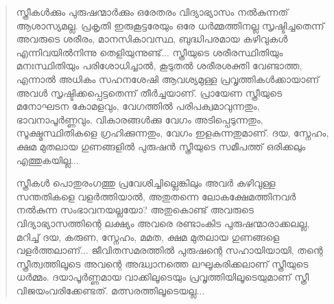 \begin{quotation}

\noindent
സ്ത്രീകൾക്കും പുരുഷന്മാർക്കും ഒരേതരം വിദ്യാഭ്യാസം നൽകുന്നത് ആശാസ്യമല്ല. പ്രകൃതി ഇരുകൂട്ടരേയും ഒരേ ധർമ്മത്തിനല്ല സൃഷ്ടിച്ചതെന്ന് അവരുടെ ശരീരം, മാനസികാവസ്ഥ, ബുദ്ധിപരമായ കഴിവുകൾ എന്നിവയിൽനിന്നു തെളിയുന്നുണ്ട്... സ്ത്രീയുടെ ശരീരസ്ഥിതിയും മനഃസ്ഥിതിയും പരിശോധിച്ചാൽ, കൂടുതൽ ശരീരശക്തി വേണ്ടാത്ത, എന്നാൽ അധികം സഹനശേഷി ആവശ്യമുള്ള പ്രവൃത്തികൾക്കായാണ് അവൾ സൃഷ്ടിക്കപ്പെട്ടതെന്ന് തീർച്ചയാണ്. പ്രായേണ സ്ത്രീയുടെ മനോഘടന കോമളവും, വേഗത്തിൽ പരിപക്വമാവുന്നതും, ഭാവനാപൂർണ്ണവും, വികാരങ്ങൾക്കു വേഗം അടിപ്പെടുന്നതും, സൂക്ഷ്മസ്ഥിതികളെ ഗ്രഹിക്കുന്നതും, വേഗം ഇളകുന്നതുമാണ്. ദയ, സ്നേഹം, ക്ഷമ മുതലായ ഗുണങ്ങളിൽ പുരുഷൻ സ്ത്രീയുടെ സമീപത്ത് ഒരിക്കലും എത്തുകയില്ല...

\noindent
സ്ത്രീകൾ പൊതുരംഗത്തു പ്രവേശിച്ചില്ലെങ്കിലും അവർ കഴിവുള്ള സന്തതികളെ വളർത്തിയാൽ, അതുതന്നെ ലോകക്ഷേമത്തിനവർ നൽകുന്ന സംഭാവനയല്ലയോ? അതുകൊണ്ട് അവരുടെ വിദ്യാഭ്യാസത്തിന്റെ ലക്ഷ്യം അവരെ രണ്ടാംകിട പുരുഷന്മാരാക്കലല്ല, മറിച്ച് ദയ, കരുണ, സ്നേഹം, മമത, ക്ഷമ മുതലായ ഗുണങ്ങളെ വളർത്തലാണ്... ജീവിതസമരത്തിൽ പുരുഷന്റെ സഹായിയായി, തന്റെ സ്ത്രീത്വത്തിലൂടെ അവന്റെ അദ്ധ്വാനത്തെ ലഘൂകരിക്കലാണ് സ്ത്രീയുടെ ധർമ്മം. ദയാപൂർണ്ണമായ വാക്കിലൂടെയും പ്രവൃത്തിയിലൂടെയുമാണ് സ്ത്രീ വിജയംവരിക്കേണ്ടത്. മത്സരത്തിലൂടെയല്ല...

\end{quotation}

